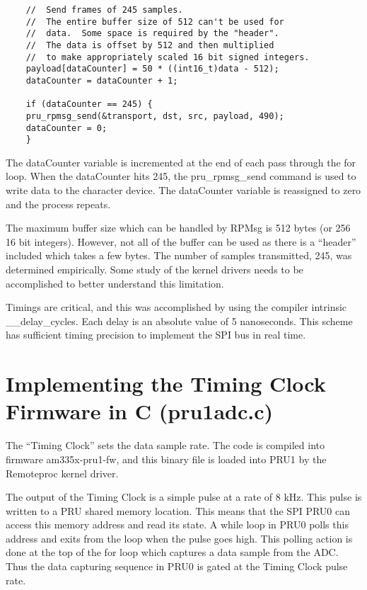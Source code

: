 \begin{verbatim}
    //  Send frames of 245 samples.
    //  The entire buffer size of 512 can't be used for
    //  data.  Some space is required by the "header".
    //  The data is offset by 512 and then multiplied
    //  to make appropriately scaled 16 bit signed integers.
    payload[dataCounter] = 50 * ((int16_t)data - 512);
    dataCounter = dataCounter + 1;
    
    if (dataCounter == 245) {
    pru_rpmsg_send(&transport, dst, src, payload, 490);
    dataCounter = 0;
    }
\end{verbatim}

The dataCounter variable is incremented at the end of each pass through the for loop.  When the dataCounter hits 245, the pru\_rpmsg\_send command is used to write data to the character device. The dataCounter variable is reassigned to zero and the process repeats.

The maximum buffer size which can be handled by RPMsg is 512 bytes (or 256 16 bit integers).  However, not all of the buffer can be used as there is a ``header'' included which takes a few bytes.  The number of samples transmitted, 245, was determined empirically.  Some study of the kernel drivers needs to be accomplished to better understand this limitation.

Timings are critical, and this was accomplished by using the compiler intrinsic \_\_delay\_cycles.  Each delay is an absolute value of 5 nanoseconds.  This scheme has sufficient timing precision to implement the SPI bus in real time.  

\section{Implementing the Timing Clock Firmware in C (pru1adc.c)}

The ``Timing Clock'' sets the data sample rate.  The code is compiled into firmware am335x-pru1-fw, and this binary file is loaded into PRU1 by the Remoteproc kernel driver.

The output of the Timing Clock is a simple pulse at a rate of 8 kHz.  This pulse is written to a PRU shared memory location.  This means that the SPI PRU0 can access this memory address and read its state.  A while loop in PRU0 polls this address and exits from the loop when the pulse goes high.  This polling action is done at the top of the for loop which captures a data sample from the ADC.  Thus the data capturing sequence in PRU0 is gated at the Timing Clock pulse rate.

